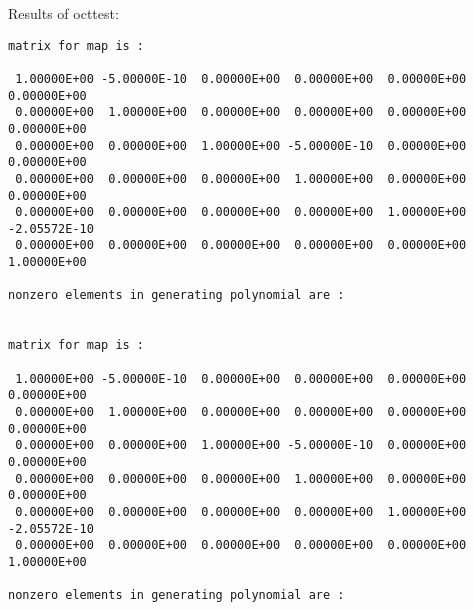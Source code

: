 Results of octtest:
\begin{footnotesize}
\begin{verbatim}
matrix for map is :

 1.00000E+00 -5.00000E-10  0.00000E+00  0.00000E+00  0.00000E+00  0.00000E+00
 0.00000E+00  1.00000E+00  0.00000E+00  0.00000E+00  0.00000E+00  0.00000E+00
 0.00000E+00  0.00000E+00  1.00000E+00 -5.00000E-10  0.00000E+00  0.00000E+00
 0.00000E+00  0.00000E+00  0.00000E+00  1.00000E+00  0.00000E+00  0.00000E+00
 0.00000E+00  0.00000E+00  0.00000E+00  0.00000E+00  1.00000E+00 -2.05572E-10
 0.00000E+00  0.00000E+00  0.00000E+00  0.00000E+00  0.00000E+00  1.00000E+00

nonzero elements in generating polynomial are :


matrix for map is :

 1.00000E+00 -5.00000E-10  0.00000E+00  0.00000E+00  0.00000E+00  0.00000E+00
 0.00000E+00  1.00000E+00  0.00000E+00  0.00000E+00  0.00000E+00  0.00000E+00
 0.00000E+00  0.00000E+00  1.00000E+00 -5.00000E-10  0.00000E+00  0.00000E+00
 0.00000E+00  0.00000E+00  0.00000E+00  1.00000E+00  0.00000E+00  0.00000E+00
 0.00000E+00  0.00000E+00  0.00000E+00  0.00000E+00  1.00000E+00 -2.05572E-10
 0.00000E+00  0.00000E+00  0.00000E+00  0.00000E+00  0.00000E+00  1.00000E+00

nonzero elements in generating polynomial are :
\end{verbatim}
\end{footnotesize}
\newpage




